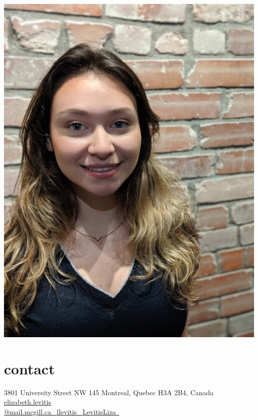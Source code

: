 \documentclass[]{friggeri-cv} %
\begin{document}


\begin{aside} %
 \includegraphics[width=\textwidth]{./llevitis_headshot.jpg}
\section{contact}
3801 University Street
NW 145
Montreal, Quebec
H3A 2B4, Canada
~
\href{mailto:elizabeth.levitis@mail.mcgill.ca}{elizabeth.levitis\\@mail.mcgill.ca~{\color{red} \faEnvelope}}
\href{http://github.com/llevitis}{llevitis~{\color{purple} \faGithub}}
\href{https://twitter.com/LevitisLiza}{LevitisLiza~{\color{blue} \faTwitter}}%

\end{aside}
\end{document}
